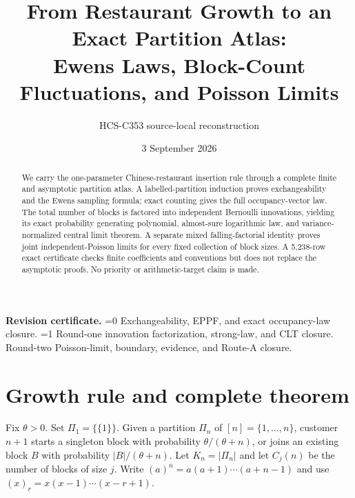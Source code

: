 \documentclass[10pt]{article}
\title{From Restaurant Growth to an Exact Partition Atlas:\\
Ewens Laws, Block-Count Fluctuations, and Poisson Limits}
\author{HCS-C353 source-local reconstruction}
\date{3 September 2026}
\providecommand{\CRevisionRound}{2}
\theoremstyle{remark}
\newcommand{\rising}[2]{(#1)^{\overline{#2}}}
\newcommand{\falling}[2]{(#1)_{\underline{#2}}}
\begin{document}
\maketitle

\begin{abstract}
We carry the one-parameter Chinese-restaurant insertion rule through a
complete finite and asymptotic partition atlas.  A labelled-partition
induction proves exchangeability and the Ewens sampling formula; exact
counting gives the full occupancy-vector law.  The total number of blocks
is factored into independent Bernoulli innovations, yielding its exact
probability generating polynomial, almost-sure logarithmic law, and
variance-normalized central limit theorem.  A separate mixed
falling-factorial identity proves joint independent-Poisson limits for every
fixed collection of block sizes.  A 5,238-row exact certificate checks
finite coefficients and conventions but does not replace the asymptotic
proofs.  No priority or arithmetic-target claim is made.
\end{abstract}

\noindent\textbf{Revision certificate.}
\ifnum\CRevisionRound=0
Exchangeability, EPPF, and exact occupancy-law closure.
\else\ifnum\CRevisionRound=1
Round-one innovation factorization, strong-law, and CLT closure.
\else
Round-two Poisson-limit, boundary, evidence, and Route-A closure.
\fi\fi
\small

\section{Growth rule and complete theorem}

Fix $\theta>0$.  Set $\Pi_1=\{\{1\}\}$.  Given a partition $\Pi_n$ of
$[n]=\{1,\ldots,n\}$, customer $n+1$ starts a singleton block with
probability $\theta/(\theta+n)$, or joins an existing block $B$ with
probability $|B|/(\theta+n)$.  Let $K_n=|\Pi_n|$ and let $C_j(n)$ be the
number of blocks of size $j$.  Write
$\rising{a}{n}=a(a+1)\cdots(a+n-1)$ and use
$\falling{x}{r}=x(x-1)\cdots(x-r+1)$.
\end{document}
